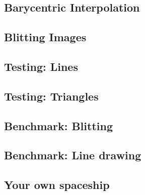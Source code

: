 \documentclass[
	letterpaper, %
	10pt, %
]{CSUniSchoolLabReport}
\begin{document}
\subsection{Barycentric Interpolation}

\subsection{Blitting Images}

\subsection{Testing: Lines}

\subsection{Testing: Triangles}

\subsection{Benchmark: Blitting}

\subsection{Benchmark: Line drawing}

\subsection{Your own spaceship}

\subsection*{}

\printbibliography %

\end{document}
